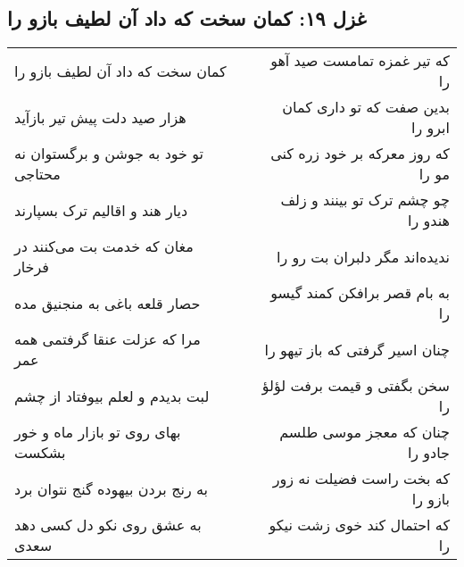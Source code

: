 \begin{center}
\section*{غزل ۱۹: کمان سخت که داد آن لطیف بازو را}
\label{sec:019}
\begin{longtable}{l p{0.5cm} r}
کمان سخت که داد آن لطیف بازو را
&&
که تیر غمزه تمامست صید آهو را
\\
هزار صید دلت پیش تیر بازآید
&&
بدین صفت که تو داری کمان ابرو را
\\
تو خود به جوشن و برگستوان نه محتاجی
&&
که روز معرکه بر خود زره کنی مو را
\\
دیار هند و اقالیم ترک بسپارند
&&
چو چشم ترک تو بینند و زلف هندو را
\\
مغان که خدمت بت می‌کنند در فرخار
&&
ندیده‌اند مگر دلبران بت رو را
\\
حصار قلعه باغی به منجنیق مده
&&
به بام قصر برافکن کمند گیسو را
\\
مرا که عزلت عنقا گرفتمی همه عمر
&&
چنان اسیر گرفتی که باز تیهو را
\\
لبت بدیدم و لعلم بیوفتاد از چشم
&&
سخن بگفتی و قیمت برفت لؤلؤ را
\\
بهای روی تو بازار ماه و خور بشکست
&&
چنان که معجز موسی طلسم جادو را
\\
به رنج بردن بیهوده گنج نتوان برد
&&
که بخت راست فضیلت نه زور بازو را
\\
به عشق روی نکو دل کسی دهد سعدی
&&
که احتمال کند خوی زشت نیکو را
\\
\end{longtable}
\end{center}

